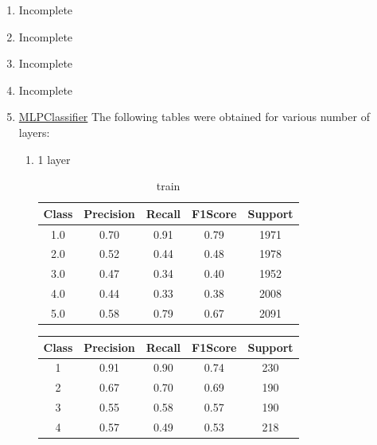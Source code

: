 \begin{enumerate}[label=(\alph*)]
    \item Incomplete
    \item Incomplete
    \item  Incomplete
    \item Incomplete
    \item \underline{MLPClassifier} The following tables were obtained for various number of layers:
          \begin{enumerate}[label=\roman*.]
              \item 1 layer
                    \begin{table}[!htb]
                        \centering
                        \begin{tabular}{ccccc}
                            \hline
                            Class & Precision & Recall & F1Score & Support \\ \hline
                            1.0   & 0.70      & 0.91   & 0.79    & 1971    \\
                            2.0   & 0.52      & 0.44   & 0.48    & 1978    \\
                            3.0   & 0.47      & 0.34   & 0.40    & 1952    \\
                            4.0   & 0.44      & 0.33   & 0.38    & 2008    \\
                            5.0   & 0.58      & 0.79   & 0.67    & 2091    \\ \hline
                        \end{tabular}
                        \caption{train}
                        \label{part f train depth 1}
                    \end{table}
                    \begin{table}[!htb]
                        \centering
                        \begin{tabular}{ccccc}
                            \hline
                            Class & Precision & Recall & F1Score & Support \\ \hline
                            1     & 0.91      & 0.90   & 0.74    & 230     \\
                            2     & 0.67      & 0.70   & 0.69    & 190     \\
                            3     & 0.55      & 0.58   & 0.57    & 190     \\
                            4     & 0.57      & 0.49   & 0.53    & 218     \\

\end{tabular}
\end{table}
\end{enumerate}
\end{enumerate}
